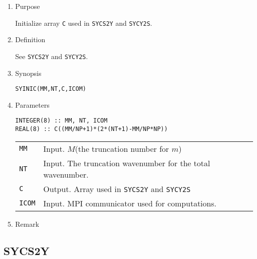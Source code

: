 \documentclass[a4paper]{scrartcl}
\begin{document}
\begin{enumerate}

\item Purpose

Initialize array \texttt{C} used in \texttt{SYCS2Y} and \texttt{SYCY2S}.

\item Definition

See \texttt{SYCS2Y} and \texttt{SYCY2S}.

\item Synopsis 

\texttt{SYINIC(MM,NT,C,ICOM)}
  
\item Parameters

\begin{verbatim}
INTEGER(8) :: MM, NT, ICOM
REAL(8) :: C((MM/NP+1)*(2*(NT+1)-MM/NP*NP))
\end{verbatim}

\begin{tabular}{ll}
\texttt{MM} & Input. $M$(the truncation number for $m$)\\
\texttt{NT} & Input. The truncation wavenumber for the total wavenumber.\\
\texttt{C} & Output. Array used in \texttt{SYCS2Y} and \texttt{SYCY2S} \\
\texttt{ICOM} & Input. MPI communicator used for computations.
\end{tabular}

\item Remark

\end{enumerate}


\subsection{SYCS2Y}
\end{document}
